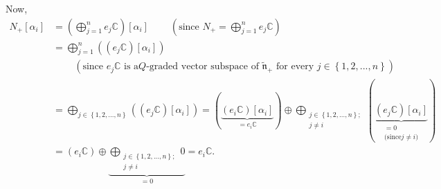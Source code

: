 \documentclass[etingof-lie.tex]{subfiles}
\begin{document}
\begin{verlong}
Now,
\begin{align*}
N_{+}\left[  \alpha_{i}\right]   &  =\left(  \bigoplus\limits_{j=1}^{n}%
e_{j}\mathbb{C}\right)  \left[  \alpha_{i}\right]  \ \ \ \ \ \ \ \ \ \ \left(
\text{since }N_{+}=\bigoplus\limits_{j=1}^{n}e_{j}\mathbb{C}\right) \\
&  =\bigoplus\limits_{j=1}^{n}\left(  \left(  e_{j}\mathbb{C}\right)  \left[
\alpha_{i}\right]  \right) \\
&  \ \ \ \ \ \ \ \ \ \ \left(  \text{since }e_{j}\mathbb{C}\text{ is a
}Q\text{-graded vector subspace of }\widetilde{\mathfrak{n}}_{+}\text{ for
every }j\in\left\{  1,2,...,n\right\}  \right) \\
&  =\bigoplus\limits_{j\in\left\{  1,2,...,n\right\}  }\left(  \left(
e_{j}\mathbb{C}\right)  \left[  \alpha_{i}\right]  \right)  =\left(
\underbrace{\left(  e_{i}\mathbb{C}\right)  \left[  \alpha_{i}\right]
}_{=e_{i}\mathbb{C}}\right)  \oplus\bigoplus\limits_{\substack{j\in\left\{
1,2,...,n\right\}  ;\\j\neq i}}\left(  \underbrace{\left(  e_{j}%
\mathbb{C}\right)  \left[  \alpha_{i}\right]  }_{\substack{=0\\\text{(since
}j\neq i\text{)}}}\right) \\
&  =\left(  e_{i}\mathbb{C}\right)  \oplus\underbrace{\bigoplus
\limits_{\substack{j\in\left\{  1,2,...,n\right\}  ;\\j\neq i}}0}_{=0}%
=e_{i}\mathbb{C}.
\end{align*}



\end{verlong}
\end{document}
